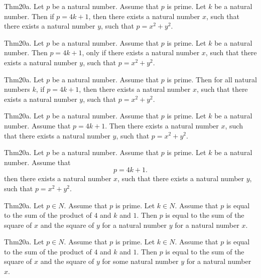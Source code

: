 \documentclass{article}
\begin{document}
Thm20a. Let $p$ be a natural number. Assume that $p$ is prime. Let $k$ be a natural number. Then if $p = 4 k + 1$, then there exists a natural number $x$, such that there exists a natural number $y$, such that $p = x ^{ 2}+ y ^{ 2}$.

Thm20a. Let $p$ be a natural number. Assume that $p$ is prime. Let $k$ be a natural number. Then $p = 4 k + 1$, only if there exists a natural number $x$, such that there exists a natural number $y$, such that $p = x ^{ 2}+ y ^{ 2}$.

Thm20a. Let $p$ be a natural number. Assume that $p$ is prime. Then for all natural numbers $k$, if $p = 4 k + 1$, then there exists a natural number $x$, such that there exists a natural number $y$, such that $p = x ^{ 2}+ y ^{ 2}$.

Thm20a. Let $p$ be a natural number. Assume that $p$ is prime. Let $k$ be a natural number. Assume that $p = 4 k + 1$. Then there exists a natural number $x$, such that there exists a natural number $y$, such that $p = x ^{ 2}+ y ^{ 2}$.

Thm20a. Let $p$ be a natural number. Assume that $p$ is prime. Let $k$ be a natural number. Assume that $$p = 4 k + 1.$$ then there exists a natural number $x$, such that there exists a natural number $y$, such that $p = x ^{ 2}+ y ^{ 2}$.

Thm20a. Let $p \in N$. Assume that $p$ is prime. Let $k \in N$. Assume that $p$ is equal to the sum of the product of $4$ and $k$ and $1$. Then $p$ is equal to the sum of the square of $x$ and the square of $y$ for a natural number $y$ for a natural number $x$.

Thm20a. Let $p \in N$. Assume that $p$ is prime. Let $k \in N$. Assume that $p$ is equal to the sum of the product of $4$ and $k$ and $1$. Then $p$ is equal to the sum of the square of $x$ and the square of $y$ for some natural number $y$ for a natural number $x$.
\end{document}
